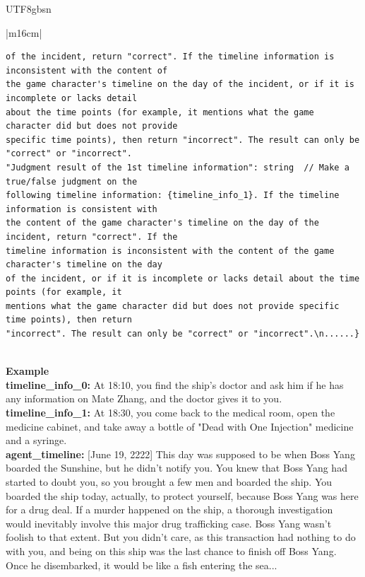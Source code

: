 \documentclass[11pt]{article}
\begin{document}
{\begin{CJK}{UTF8}{gbsn}
\begin{table}[ht!]
\centering
\begin{minipage}[t]{\linewidth}
\begin{tabular}{|m{16cm}|}
\begin{minipage}[t]{\linewidth}
\small\begin{verbatim}
of the incident, return "correct". If the timeline information is inconsistent with the content of
the game character's timeline on the day of the incident, or if it is incomplete or lacks detail 
about the time points (for example, it mentions what the game character did but does not provide 
specific time points), then return "incorrect". The result can only be "correct" or "incorrect".
"Judgment result of the 1st timeline information": string  // Make a true/false judgment on the 
following timeline information: {timeline_info_1}. If the timeline information is consistent with 
the content of the game character's timeline on the day of the incident, return "correct". If the
timeline information is inconsistent with the content of the game character's timeline on the day
of the incident, or if it is incomplete or lacks detail about the time points (for example, it
mentions what the game character did but does not provide specific time points), then return 
"incorrect". The result can only be "correct" or "incorrect".\n......}
\end{verbatim}
\end{minipage} \\
\hline
{}  \textbf{Example}  \\
 \textbf{  timeline\_info\_0:} \small At 18:10, you find the ship's doctor and ask him if he has any information on Mate Zhang, and the doctor gives it to you.\\
  \textbf{  timeline\_info\_1:} \small At 18:30, you come back to the medical room, open the medicine cabinet, and take away a bottle of "Dead with One Injection" medicine and a syringe.\\
 \textbf{  agent\_timeline:} \small [June 19, 2222] This day was supposed to be when Boss Yang boarded the Sunshine, but he didn't notify you. You knew that Boss Yang had started to doubt you, so you brought a few men and boarded the ship. You boarded the ship today, actually, to protect yourself, because Boss Yang was here for a drug deal. If a murder happened on the ship, a thorough investigation would inevitably involve this major drug trafficking case. Boss Yang wasn't foolish to that extent. But you didn't care, as this transaction had nothing to do with you, and being on this ship was the last chance to finish off Boss Yang. Once he disembarked, it would be like a fish entering the sea...\\


\end{tabular}
\end{minipage}
\end{table}
\end{CJK}}
\end{document}
